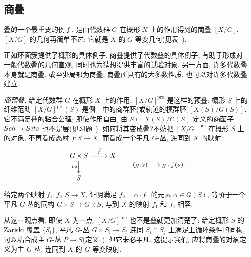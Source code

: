 \subsection{商叠}\label{src:1.6.5-subsection}
叠的一个最重要的例子, 是由代数群 $G$ 在概形 $X$ 上的作用得到的商叠 $[X/G]$. $[X/G]$ 的几何再简单不过: 它就是 $X$ 的 $G$-等变几何(见表~).

正如环面簇提供了概形的具体例子, 商叠提供了代数叠的具体例子, 有助于形成对一般代数叠的几何直观, 同时也为猜想提供丰富的试验对象. 另一方面, 许多代数叠本身就是商叠, 或至少局部为商叠; 商叠所具有的大多数性质, 也可以对许多代数叠建立.

\textit{商预叠.} 给定代数群 $G$ 在概形 $X$ 上的作用,  $[X/G]^{\mathrm{pre}}$ 是这样的预叠: 概形 $S$ 上的纤维范畴 $[X/G]^{\mathrm{pre}}(S)$ 是例~~中的商群胚(或轨道的模群胚)$[X(S)/G(S)]$. 它不满足叠的粘合公理; 即使作用自由, 由 $S\mapsto X(S)/G(S)$ 定义的商函子 $Sch\to Sets$ 也不是层(见习题~). 如何将其变成叠?不妨把 $[X/G]^{\mathrm{pre}}$ 在概形 $S$ 上的对象, 不再看成态射 $f:S\to X$, 而看成一个平凡 $G$-丛, 连同到 $X$ 的映射: 
\[
\begin{tikzcd}
G\times S\arrow[r,"\widetilde f"]\arrow[d,"p_2"'] & X\\
S &
\end{tikzcd}
\qquad (g,s)\longmapsto g\cdot f(s).
\]
\begin{exercise}[简单]\label{src:1.6.9}
给定两个映射 $f_1,f_2:S\to X$, 证明满足 $f_2=\alpha\cdot f_1$ 的元素 $\alpha\in G(S)$, 等价于一个平凡 $G$-丛的同构 $G\times S\to G\times S$, 与到 $X$ 的映射 $\widetilde f_1$ 和 $\widetilde f_2$ 相容.
\end{exercise}
从这一观点看, 即使 $X$ 为一点, $[X/G]^{\mathrm{pre}}$ 也不是叠就更加清楚了: 给定概形 $S$ 的 Zariski 覆盖 $\{S_i\}$, 平凡 $G$-丛 $G\times S_i\to S_i$ 连同 $S_i\cap S_j$ 上满足上循环条件的同构, 可以粘合成主 $G$-丛 $P\to S$(定义~), 但它未必平凡. 这提示我们, 应将商叠的对象定义为主 $G$-丛, 连同到 $X$ 的 $G$-等变映射.

